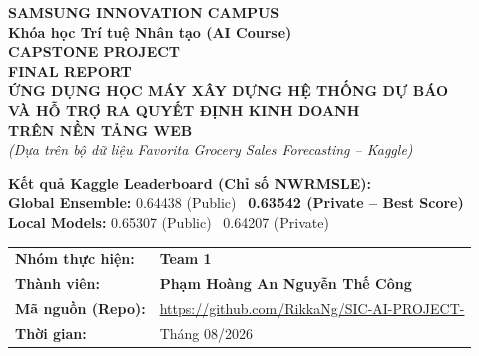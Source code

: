 \documentclass[12pt,a4paper]{report}
\begin{document}

\begin{titlepage}
\thispagestyle{empty}

\vspace*{0.2cm}
{\fontsize{22pt}{26pt}\selectfont\textbf{SAMSUNG INNOVATION CAMPUS}}\\[4pt]
{\fontsize{18pt}{22pt}\selectfont\textbf{Khóa học Trí tuệ Nhân tạo (AI Course)}}\\[1.0cm]

{\fontsize{34pt}{40pt}\selectfont\bfseries\textcolor{samsungblue}{CAPSTONE PROJECT}}\\[0.2cm]
{\fontsize{34pt}{40pt}\selectfont\bfseries\textcolor{samsungblue}{FINAL REPORT}}\\[1.2cm]

{\fontsize{18pt}{22pt}\selectfont\textbf{ỨNG DỤNG HỌC MÁY XÂY DỰNG HỆ THỐNG DỰ BÁO\\[4pt]
VÀ HỖ TRỢ RA QUYẾT ĐỊNH KINH DOANH\\[4pt]
TRÊN NỀN TẢNG WEB}}\\[0.4cm]
{\large\textit{(Dựa trên bộ dữ liệu Favorita Grocery Sales Forecasting -- Kaggle)}}\\[0.8cm]

\begin{tcolorbox}[colback=samsungblue!8, colframe=samsungblue, arc=2.5mm, width=0.96\textwidth]
\centering
\textbf{\textcolor{samsungblue}{Kết quả Kaggle Leaderboard (Chỉ số NWRMSLE):}}\\[2pt]
\small \textbf{Global Ensemble:} 0.64438 (Public) \textbar\ \textbf{0.63542 (Private -- Best Score)}\\
\small \textbf{Local Models:} 0.65307 (Public) \textbar\ 0.64207 (Private)
\end{tcolorbox}

\vspace{0.4cm}

\begin{tcolorbox}[colback=lightgraybg, colframe=samsungblue!60, arc=2.5mm, width=0.96\textwidth]
\small
\renewcommand{\arraystretch}{1.2}
\begin{tabularx}{\textwidth}{lX}
\textbf{Nhóm thực hiện:} & \textbf{Team 1} \\
\textbf{Thành viên:} & \textbf{Phạm Hoàng An} \qquad \textbf{Nguyễn Thế Công} \\
\textbf{Mã nguồn (Repo):} & \url{https://github.com/RikkaNg/SIC-AI-PROJECT-} \\
\textbf{Thời gian:} & Tháng 08/2026 \\
\end{tabularx}
\end{tcolorbox}


\end{titlepage}
\end{document}
